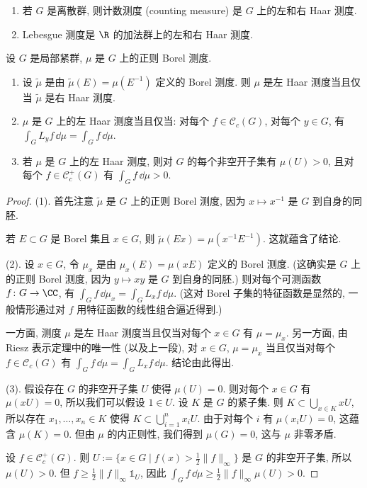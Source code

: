 \begin{example}
\label{exa:I.2.5}
\begin{enumerate}
\item[(1)] 若 $G$ 是离散群, 则计数测度 (counting measure) 是 $G$ 上的左和右 Haar 测度.
\item[(2)] Lebesgue 测度是 $\R$ 的加法群上的左和右 Haar 测度.
\end{enumerate}
\end{example}

\begin{proposition}
\label{prop:I.2.6}
设 $G$ 是局部紧群, $\mu$ 是 $G$ 上的正则 Borel 测度.
\begin{enumerate}
\item[(1)] 设 $\tilde{\mu}$ 是由 $\tilde{\mu}(E) = \mu(E^{-1})$ 定义的 Borel 测度. 则 $\mu$ 是左 Haar 测度当且仅当 $\tilde{\mu}$ 是右 Haar 测度.
\item[(2)] $\mu$ 是 $G$ 上的左 Haar 测度当且仅当: 对每个 $f \in \mathcal{C}_c(G)$, 对每个 $y \in G$, 有 $\int_G L_yf \,\dd\mu = \int_G f \,\dd\mu$.
\item[(3)] 若 $\mu$ 是 $G$ 上的左 Haar 测度, 则对 $G$ 的每个非空开子集有 $\mu(U) > 0$, 且对每个 $f \in \mathcal{C}_c^+(G)$ 有 $\int_G f \,\dd\mu > 0$.
\end{enumerate}
\end{proposition}

\begin{proof}
(1). 首先注意 $\tilde{\mu}$ 是 $G$ 上的正则 Borel 测度, 因为 $x \longmapsto x^{-1}$ 是 $G$ 到自身的同胚.

若 $E \subset G$ 是 Borel 集且 $x \in G$, 则 $\tilde{\mu}(Ex) = \mu(x^{-1}E^{-1})$. 这就蕴含了结论.

(2). 设 $x \in G$, 令 $\mu_x$ 是由 $\mu_x(E) = \mu(xE)$ 定义的 Borel 测度. (这确实是 $G$ 上的正则 Borel 测度, 因为 $y \longmapsto xy$ 是 $G$ 到自身的同胚.) 则对每个可测函数 $f \colon G \to \CC$, 有 $\int_G f \,\dd\mu_x = \int_G L_xf \,\dd\mu$. (这对 Borel 子集的特征函数是显然的, 一般情形通过对 $f$ 用特征函数的线性组合逼近得到.)

一方面, 测度 $\mu$ 是左 Haar 测度当且仅当对每个 $x \in G$ 有 $\mu = \mu_x$. 另一方面, 由 Riesz 表示定理中的唯一性 (以及上一段), 对 $x \in G$, $\mu = \mu_x$ 当且仅当对每个 $f \in \mathcal{C}_c(G)$ 有 $\int_G f \,\dd\mu = \int_G L_xf \,\dd\mu$. 结论由此得出.

(3). 假设存在 $G$ 的非空开子集 $U$ 使得 $\mu(U) = 0$. 则对每个 $x \in G$ 有 $\mu(xU) = 0$, 所以我们可以假设 $1 \in U$. 设 $K$ 是 $G$ 的紧子集. 则 $K \subset \bigcup_{x \in K} xU$, 所以存在 $x_1, \ldots, x_n \in K$ 使得 $K \subset \bigcup_{i=1}^n x_iU$. 由于对每个 $i$ 有 $\mu(x_iU) = 0$, 这蕴含 $\mu(K) = 0$. 但由 $\mu$ 的内正则性, 我们得到 $\mu(G) = 0$, 这与 $\mu$ 非零矛盾.

设 $f \in \mathcal{C}_c^+(G)$. 则 $U := \{x \in G \mid f(x) > \frac{1}{2}\|f\|_{\infty}\}$ 是 $G$ 的非空开子集, 所以 $\mu(U) > 0$. 但 $f \geq \frac{1}{2}\|f\|_{\infty} \mathbb{1}_U$, 因此 $\int_G f \,\dd\mu \geq \frac{1}{2}\|f\|_{\infty}\mu(U) > 0$.
\end{proof}

